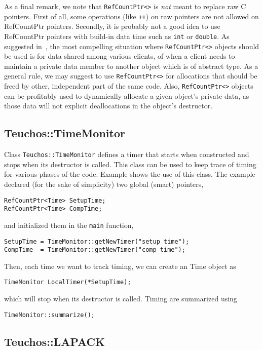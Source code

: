As a final remark, we note that \verb!RefCountPtr<>! is {\sl not} meant
to replace raw C pointers. First of all, some operations (like
\verb!++!) on raw pointers are not allowed on RefCountPtr pointers.
Secondly, it is probably not a good idea to use RefCountPtr pointers
with build-in data time such as \verb!int! or \verb!double!. As
suggested in~\cite{RefCountPtr-manual}, the most compelling situation
where \verb!RefCountPtr<>! objects should be used is for data shared
among various clients, of when a client needs to maintain a private data
member to another object which is of abstract type. As a general rule,
we may suggest to use \verb!RefCountPtr<>! for allocations that should
be freed by other, independent part of the same code. Also,
\verb!RefCountPtr<>! objects can be profitably used to dynamically
allocate a given object's private data, as those data will not explicit
deallocations in the object's destructor.


\subsection{Teuchos::TimeMonitor}
\label{sec:teuchos:TimeMonitor}

Class \verb!Teuchos::TimeMonitor! defines a timer that starts when
constructed and stops when its destructor is called. This class can be
used to keep trace of timing for various phases of the code. Example
 shows the use of this class. The example
declared (for the sake of simplicity) two global (smart) pointers,
\begin{verbatim}
RefCountPtr<Time> SetupTime;
RefCountPtr<Time> CompTime;
\end{verbatim}
and initialized them in the \verb!main! function,
\begin{verbatim}
SetupTime = TimeMonitor::getNewTimer("setup time");
CompTime  = TimeMonitor::getNewTimer("comp time");
\end{verbatim}
Then, each time we want to track timing, we can create an Time object as
\begin{verbatim}
TimeMonitor LocalTimer(*SetupTime);
\end{verbatim}
which will stop when its destructor is called. Timing are summarized
using
\begin{verbatim}
TimeMonitor::summarize();
\end{verbatim}


\subsection{Teuchos::LAPACK}
\label{sec:teuchos:LAPACK}

